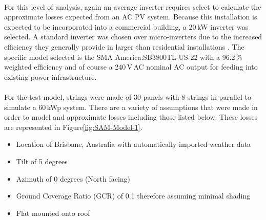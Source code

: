 \paragraph{}
For this level of analysis, again an average inverter requires select to calculate the approximate losses expected from an AC PV system. Because this installation is expected to be incorporated into a commercial building, a 20\,kW inverter was selected. A standard inverter was chosen over micro-inverters due to the increased efficiency they generally provide in larger than residential installations \cite{MicroInverterThesis}. The specific model selected is the SMA America:SB3800TL-US-22 with a 96.2\,\% weighted efficiency and of course a 240\,V\,AC nominal AC output for feeding into existing power infrastructure. 

\paragraph{}
For the test model, strings were made of 30 panels with 8 strings in parallel to simulate a 60\,kWp system. There are a variety of assumptions that were made in order to model and approximate losses including those listed below. These losses are represented in Figure\ref{fig:SAM-Model-1}. 

\begin{itemize}[noitemsep,nolistsep]
	\item Location of Brisbane, Australia with automatically imported weather data
	\item Tilt of 5 degrees
	\item Azimuth of 0 degrees (North facing)
	\item Ground Coverage Ratio (GCR) of 0.1 therefore assuming minimal shading
	\item Flat mounted onto roof
\end{itemize}

